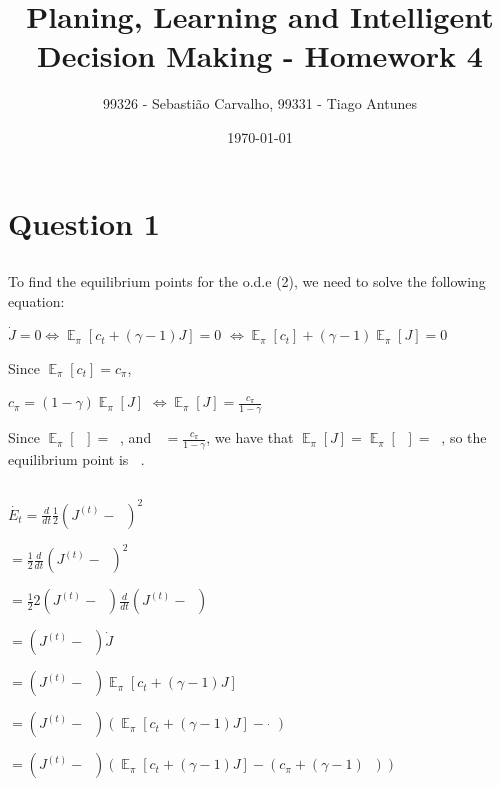\documentclass{article}
\title{Planing, Learning and Intelligent Decision Making - Homework 4}
\author{99326 - Sebastião Carvalho, 99331 - Tiago Antunes}
\date{\today}
\DeclareMathOperator{\EX}{\mathbb{E}}%
\DeclareMathOperator{\JPI}{J^\pi} %
\begin{document}
\maketitle

\tableofcontents

\section{Question 1}

\subsection{}

To find the equilibrium points for the o.d.e (2), we need to solve the following equation:

\medskip

$\dot{J} = 0 \Leftrightarrow \EX_\pi[c_t + (\gamma - 1) J] = 0$
$\Leftrightarrow \EX_\pi[c_t] + (\gamma - 1) \EX_\pi[J] = 0$

\medskip

Since $\EX_\pi[c_t] = c_\pi$, 

\medskip

$c_\pi = (1 - \gamma) \EX_\pi[J]$
$\Leftrightarrow \EX_\pi[J] = \frac{c_\pi}{1 - \gamma}$

\medskip

Since $\EX_\pi[\JPI] = \JPI$, and $\JPI = \frac{c_\pi}{1 - \gamma}$, we have that $\EX_\pi[J] = \EX_\pi[\JPI] = \JPI$,
so the equilibrium point is $\JPI$.

\subsection{}

$\dot{E_t} = \frac{d}{dt}  \frac{1}{2}  \left(J^{(t)} - \JPI \right)^2$

$ = \frac{1}{2}  \frac{d}{dt}  \left(J^{(t)} - \JPI \right)^2$

$ = \frac{1}{2}  2 \left(J^{(t)} - \JPI \right) \frac{d}{dt}  \left(J^{(t)} - \JPI \right)$

$ = \left(J^{(t)} - \JPI \right) \dot{J}$

$ = \left(J^{(t)} - \JPI \right) \EX_\pi[c_t + (\gamma - 1) J]$

$ = \left(J^{(t)} - \JPI \right) (\EX_\pi[c_t + (\gamma - 1) J] - \dot{\JPI})$

$ = \left(J^{(t)} - \JPI \right) (\EX_\pi[c_t + (\gamma - 1) J] - (c_\pi + (\gamma - 1) \JPI))$
\end{document}
